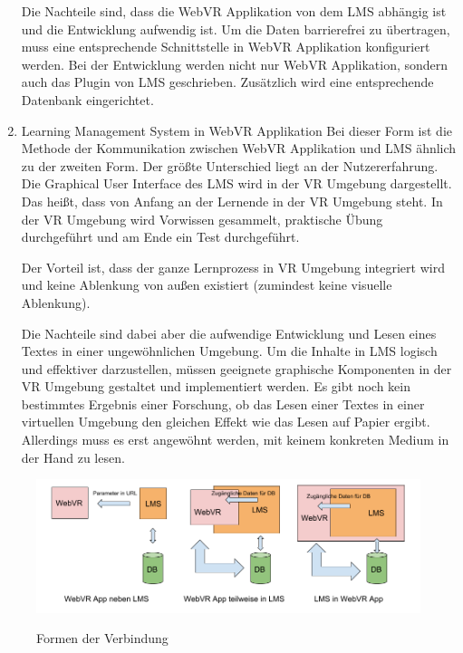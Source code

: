 \begin{enumerate}
     Die Nachteile sind, dass die WebVR Applikation von dem LMS abhängig ist und die Entwicklung aufwendig ist. Um die Daten barrierefrei zu übertragen, muss eine entsprechende Schnittstelle in WebVR Applikation konfiguriert werden. Bei der Entwicklung werden nicht nur WebVR Applikation, sondern auch das Plugin von LMS geschrieben. Zusätzlich wird eine entsprechende Datenbank eingerichtet.
     
   \item Learning Management System in WebVR Applikation
     \subitem Bei dieser Form ist die Methode der Kommunikation zwischen WebVR Applikation und LMS ähnlich zu der zweiten Form. Der größte Unterschied liegt an der Nutzererfahrung. Die Graphical User Interface des LMS wird in der VR Umgebung dargestellt. Das heißt, dass von Anfang an der Lernende in der VR Umgebung steht. In der VR Umgebung wird Vorwissen gesammelt, praktische Übung durchgeführt und am Ende ein Test durchgeführt.
     
     Der Vorteil ist, dass der ganze Lernprozess in VR Umgebung integriert wird und keine Ablenkung von außen existiert (zumindest keine visuelle Ablenkung).
     
     Die Nachteile sind dabei aber die aufwendige Entwicklung und Lesen eines Textes in einer ungewöhnlichen Umgebung. Um die Inhalte in LMS logisch und effektiver darzustellen, müssen geeignete graphische Komponenten in der VR Umgebung gestaltet und implementiert werden. Es gibt noch kein bestimmtes Ergebnis einer Forschung, ob das Lesen einer Textes in einer virtuellen Umgebung den gleichen Effekt wie das Lesen auf Papier ergibt. Allerdings muss es erst angewöhnt werden, mit keinem konkreten Medium in der Hand zu lesen.
 \end{enumerate}
 
\begin{figure}[ht]
\vspace*{1em}
\centering
\caption{Formen der Verbindung}
\includegraphics[width=\textwidth]{images/formenderVerbindung.png}
\label{fig:formenderVerbindung} 
\end{figure}

